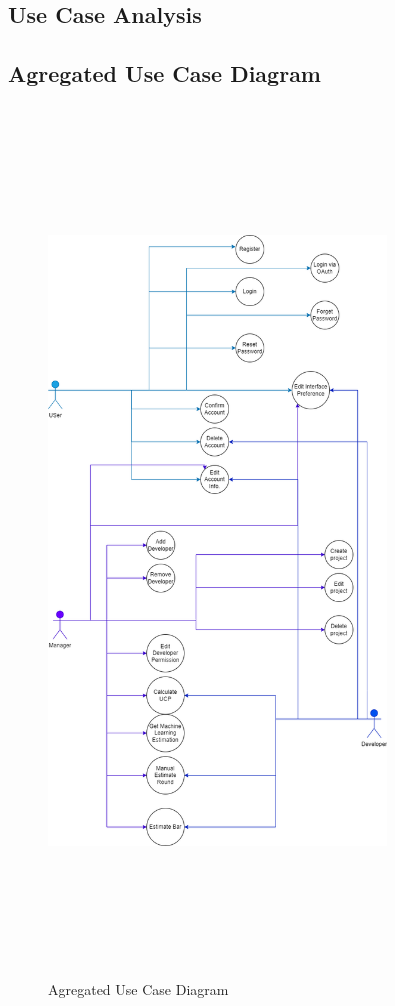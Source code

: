 \pagebreak

\subsection{Use Case Analysis}


\subsection{Agregated Use Case Diagram}
\begin{figure}[H]
    \includegraphics[height=23cm, width=0.8\textwidth]{./diagrams/Use Case/agrregated new.png}
    \centering 
    \caption{Agregated Use Case Diagram}
    \label{figurea}
    \end{figure}
    